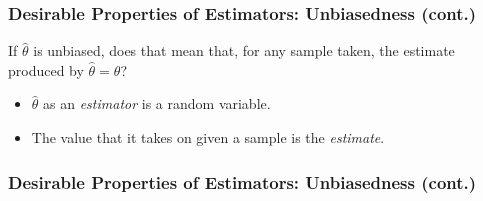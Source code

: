 \documentclass[12pt, block=fill]{beamer}
\begin{document}
\begin{frame}[t]
  \frametitle{Desirable Properties of Estimators: Unbiasedness (cont.)}
    If $\hat{\theta}$ is unbiased, does that mean that, for any sample
  taken, the estimate produced by $\hat{\theta} = \theta$?
  \begin{itemize}
  \item $\hat{\theta}$ as an \textit{estimator} is a random variable.
  \item The value that it takes on given a sample is the
    \textit{estimate}. 
  \end{itemize}
\end{frame}

\begin{frame}
  \frametitle{Desirable Properties of Estimators: Unbiasedness
    (cont.)}

\end{frame} 
\end{document}
